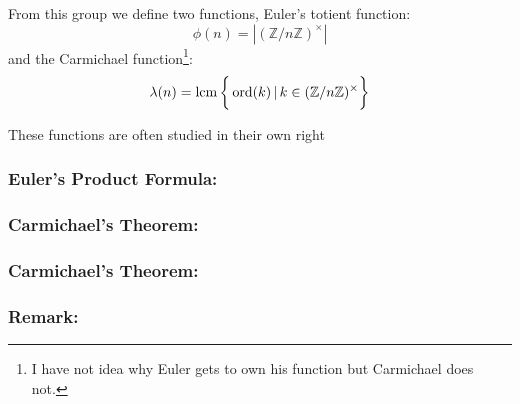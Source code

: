 From this group we define two functions,
Euler's totient function:
\[\phi(n) = |(\mathbb{Z}/n\mathbb{Z})^\times|\]
and the Carmichael function\footnote{I have not idea why Euler gets to own his function but Carmichael does not.}:
\[\lambda(n) = \operatorname{lcm}\bigg\{\operatorname{ord}(k)\,|\, k\in(\mathbb{Z}/n\mathbb{Z})^\times\bigg\}\]

These functions are often studied in their own right

\subsubsection{Euler's Product Formula:}
\subsubsection{Carmichael's Theorem:}
\subsubsection{Carmichael's Theorem:}
\subsubsection{Remark:}
